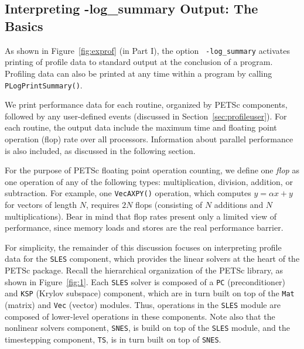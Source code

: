 \subsection{Interpreting -log\_summary Output: The Basics}

As shown in Figure~\ref{fig:exprof} (in Part I), the option {\tt
-log\_summary}  activates printing of profile
data to standard output at the conclusion of a program.  Profiling
data can also be printed at any time within a program by calling {\tt
PLogPrintSummary()}.

We print performance data for each routine, organized by PETSc
components, followed by any user-defined events (discussed in
Section~\ref{sec:profileuser}).  For each routine, the output data
include the maximum time and floating point operation (flop) rate over
all processors.  Information about parallel performance is also
included, as discussed in the following section.

For the purpose of PETSc floating point operation counting, we define
one {\em flop} as one operation of any of the following types:
multiplication, division, addition, or subtraction.  For example, one
{\tt VecAXPY()} operation, which computes $y = \alpha x + y$ for
vectors of length $N$, requires $2N$ flops (consisting of $N$
additions and $N$ multiplications).  Bear in mind that flop rates
present only a limited view of performance, since memory loads and stores are
the real performance barrier.

For simplicity, the remainder of this discussion focuses on
interpreting profile data for the {\tt SLES} component, 
which provides the linear solvers at the heart of the
PETSc package.  Recall the hierarchical organization of the PETSc
library, as shown in Figure~\ref{fig:1}.  Each {\tt SLES} solver 
is composed of a {\tt PC} (preconditioner) and {\tt KSP} (Krylov
subspace) component, which are in turn built on top of the {\tt Mat} 
(matrix) and {\tt Vec} (vector) modules.  Thus, operations in the
{\tt SLES} module are composed of lower-level operations in these
components.  Note also that the nonlinear solvers component, {\tt SNES}, 
is build on top of the {\tt SLES} module, and the timestepping
component, {\tt TS}, is in turn built on top of {\tt SNES}.

